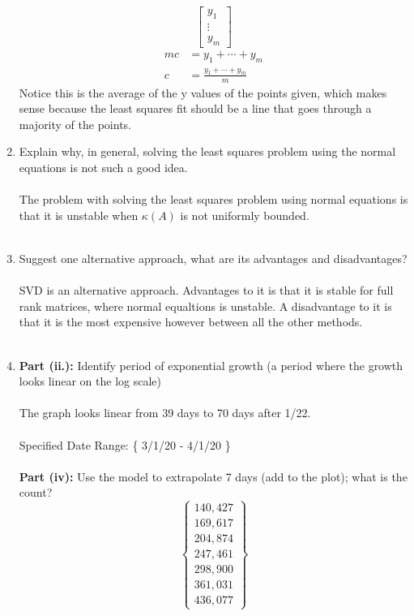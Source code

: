 \documentclass[12pt]{article}
\begin{document}
\begin{enumerate}[label = (\alph*)]
$$\begin{bmatrix}
		y_1 \\
		\vdots \\
		y_m
		\end{bmatrix}
		$$
		\begin{align*}
		mc &= y_1 + \dotsb + y_m \\
		c &= \frac{y_1 + \dotsb + y_m}{m}
		\end{align*}
		Notice this is the average of the y values of the points given, which makes sense because the least squares fit should be a line that goes through a majority of the points. 
		\newpage
		\item Explain why, in general, solving the least squares problem using the
		normal equations is not such a good idea. \\ \\
		The problem with solving the least squares problem using normal equations is that it is unstable when $\kappa(A)$ is not uniformly bounded. 
		\\ \\
		\item  Suggest one alternative approach, what are its advantages and disadvantages?
		\\ \\
		SVD is an alternative approach. Advantages to it is that it is stable for full rank matrices, where normal equaltions is unstable.  A disadvantage to it is that it is the most expensive however between all the other methods. 
		\\ \\
		\item \textbf{Part (ii.): }Identify period of exponential growth (a period where the growth looks linear on the log scale) \\ \\
		The graph looks linear from 39 days to 70 days after 1/22. 
		\\ \\
		Specified Date Range: \{ 3/1/20 - 4/1/20 \} 
		\\ \\
		\textbf{Part (iv): }Use the model to extrapolate 7 days (add to the plot); what is the count?
		$$
		\begin{Bmatrix}
			140,427 \\
			169,617 \\
			204,874 \\
			247,461 \\
			298,900 \\
			361,031 \\
			436,077
		\end{Bmatrix}
		$$
	\end{enumerate}
\end{document}
